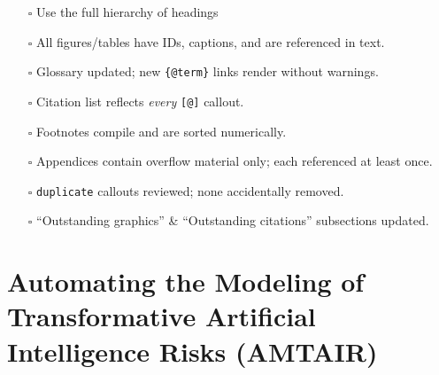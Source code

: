 \documentclass[
  11pt,
  letterpaper,
]{book}
\providecommand{\tightlist}{%
  \setlength{\itemsep}{0pt}\setlength{\parskip}{0pt}}
\begin{document}
\begin{itemize}
\tightlist
\item[$\square$]
  Use the full hierarchy of headings
\item[$\square$]
  All figures/tables have IDs, captions, and are referenced in text.\\
\item[$\square$]
  Glossary updated; new \texttt{\{@term\}} links render without
  warnings.\\
\item[$\square$]
  Citation list reflects \emph{every} \texttt{{[}@{]}} callout.\\
\item[$\square$]
  Footnotes compile and are sorted numerically.\\
\item[$\square$]
  Appendices contain overflow material only; each referenced at least
  once.\\
\item[$\square$]
  \texttt{duplicate} callouts reviewed; none accidentally removed.\\
\item[$\square$]
  ``Outstanding graphics'' \& ``Outstanding citations'' subsections
  updated.
\end{itemize}


\chapter*{Automating the Modeling of Transformative Artificial
Intelligence Risks
(AMTAIR)}\label{automating-the-modeling-of-transformative-artificial-intelligence-risks-amtair}

\end{document}
